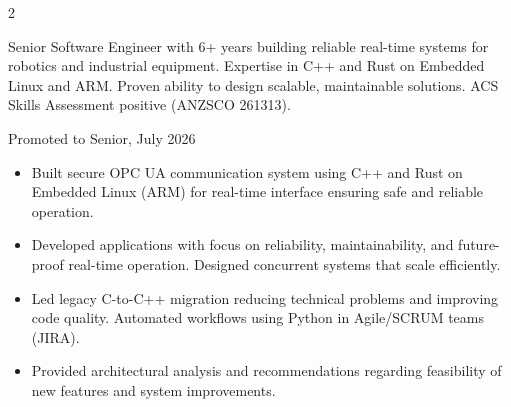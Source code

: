 \documentclass[10pt,a4paper,ragged2e,withhyper]{altacv}
\begin{document}


\makecvheader



\begin{paracol}{2}


	{\small
	Senior Software Engineer with 6+ years building reliable real-time systems for robotics and industrial equipment. Expertise in C++ and Rust on Embedded Linux and ARM. Proven ability to design scalable, maintainable solutions. ACS Skills Assessment positive (ANZSCO 261313).
	}


	{\small\color{LightGrey}Promoted to Senior, July 2026\par}
	\vspace{0.05em}
	\begin{itemize}
		\item Built secure OPC UA communication system using C++ and Rust on Embedded Linux (ARM) for real-time interface ensuring safe and reliable operation.
		\item Developed applications with focus on reliability, maintainability, and future-proof real-time operation. Designed concurrent systems that scale efficiently.
		\item Led legacy C-to-C++ migration reducing technical problems and improving code quality. Automated workflows using Python in Agile/SCRUM teams (JIRA).
		\item Provided architectural analysis and recommendations regarding feasibility of new features and system improvements.
	\end{itemize}

	\vspace{0.3em}
	\divider
	\vspace{0.3em}


\end{paracol}
\end{document}
